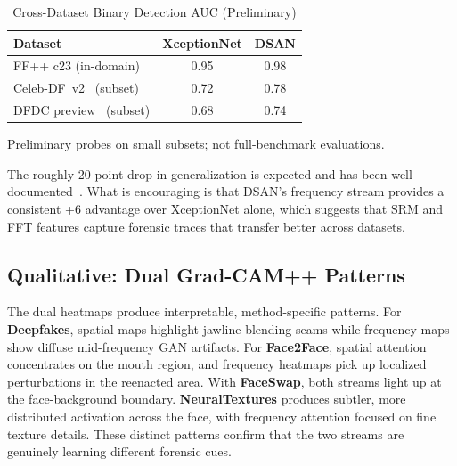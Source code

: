 \begin{table}[t]
\centering
\caption{Cross-Dataset Binary Detection AUC (Preliminary)}
\label{tab:cross}
\begin{tabular}{@{}lcc@{}}
\toprule
\textbf{Dataset} & \textbf{XceptionNet} & \textbf{DSAN} \\
\midrule
FF++ c23 (in-domain) & 0.95 & 0.98 \\
Celeb-DF~v2~\cite{li2020celebdf} (subset) & 0.72 & 0.78 \\
DFDC preview~\cite{dolhansky2020dfdc} (subset) & 0.68 & 0.74 \\
\bottomrule
\end{tabular}
\vspace{2pt}
{\scriptsize Preliminary probes on small subsets; not full-benchmark evaluations.}
\end{table}

The roughly 20-point drop in generalization is expected and has been well-documented~\cite{li2020celebdf}. What is encouraging is that DSAN's frequency stream provides a consistent +6 advantage over XceptionNet alone, which suggests that SRM and FFT features capture forensic traces that transfer better across datasets.

\subsection{Qualitative: Dual Grad-CAM++ Patterns}

The dual heatmaps produce interpretable, method-specific patterns. For \textbf{Deepfakes}, spatial maps highlight jawline blending seams while frequency maps show diffuse mid-frequency GAN artifacts. For \textbf{Face2Face}, spatial attention concentrates on the mouth region, and frequency heatmaps pick up localized perturbations in the reenacted area. With \textbf{FaceSwap}, both streams light up at the face-background boundary. \textbf{NeuralTextures} produces subtler, more distributed activation across the face, with frequency attention focused on fine texture details. These distinct patterns confirm that the two streams are genuinely learning different forensic cues.
